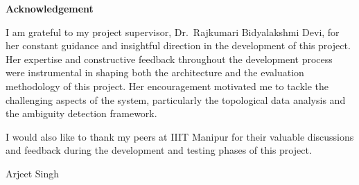 \begin{flushleft}
    {\Huge\bfseries Acknowledgement}
\end{flushleft}

\vspace{1.5cm}

I am grateful to my project supervisor, Dr.\ Rajkumari Bidyalakshmi Devi, for her constant
guidance and insightful direction in the development of this project. Her expertise and
constructive feedback throughout the development process were instrumental in shaping both
the architecture and the evaluation methodology of this project. Her encouragement motivated
me to tackle the challenging aspects of the system, particularly the topological data analysis and
the ambiguity detection framework.

I would also like to thank my peers at IIIT Manipur for their valuable discussions and feedback
during the development and testing phases of this project.

\vspace{3cm}
\begin{flushright}
    Arjeet Singh
\end{flushright}
